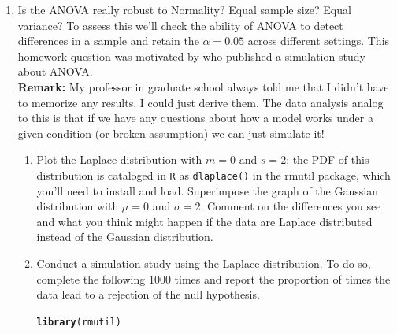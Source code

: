 \documentclass{article}\usepackage[]{graphicx}\usepackage[]{color}
\makeatletter
\newcommand{\hlstd}[1]{\textcolor[rgb]{0.345,0.345,0.345}{#1}}%
\newcommand{\hlkwd}[1]{\textcolor[rgb]{0.737,0.353,0.396}{\textbf{#1}}}%
\newenvironment{kframe}{%
 \def\at@end@of@kframe{}%
 \ifinner\ifhmode%
  \def\at@end@of@kframe{\end{minipage}}%
  \begin{minipage}{\columnwidth}%
 \fi\fi%
 \def\FrameCommand##1{\hskip\@totalleftmargin \hskip-\fboxsep
 \colorbox{shadecolor}{##1}\hskip-\fboxsep
     \hskip-\linewidth \hskip-\@totalleftmargin \hskip\columnwidth}%
 \MakeFramed {\advance\hsize-\width
   \@totalleftmargin\z@ \linewidth\hsize
   \@setminipage}}%
 {\par\unskip\endMakeFramed%
 \at@end@of@kframe}
\newenvironment{knitrout}{}{} %
\makeatother
\begin{document}
\begin{enumerate}
\begin{enumerate}
\begin{enumerate}
\end{enumerate}
\end{enumerate}
\newpage
\item Is the ANOVA really robust to Normality? Equal sample size? Equal variance?
To assess this we'll check the ability of ANOVA to detect differences in a 
sample and retain the $\alpha=0.05$ across different settings. This homework 
question was motivated by \cite{Blanca17} who published a simulation study 
about ANOVA.\\

\textbf{Remark:} My professor in graduate school always told me that I didn't
have to memorize any results, I could just derive them. The data analysis
analog to this is that if we have any questions about how a model works
under a given condition (or broken assumption) we can just simulate it!
\begin{enumerate}
  \item Plot the Laplace distribution with $m=0$ and $s=2$; the PDF
  of this distribution is cataloged in \texttt{R} as \texttt{dlaplace()} 
  in the rmutil package, which you'll need to install and load. Superimpose
  the graph of the Gaussian distribution with $\mu=0$ and $\sigma=2$. Comment
  on the differences you see and what you think might happen if the data 
  are Laplace distributed instead of the Gaussian distribution.
  \item Conduct a simulation study using the Laplace distribution. To do so, 
  complete the following 1000 times and report the proportion of times the
  data lead to a rejection of the null hypothesis.\\
\begin{knitrout}
\color{fgcolor}\begin{kframe}
\begin{alltt}
\hlkwd{library}\hlstd{(rmutil)}
\end{alltt}


{\ttfamily\noindent\itshape\color{messagecolor}{\#\# \\\#\# Attaching package: 'rmutil'}}

{\ttfamily\noindent\itshape\color{messagecolor}{\#\# The following object is masked from 'package:stats':\\\#\# \\\#\# \ \ \ \ nobs}}


\end{kframe}
\end{knitrout}
\end{enumerate}
\end{enumerate}
\end{document}
